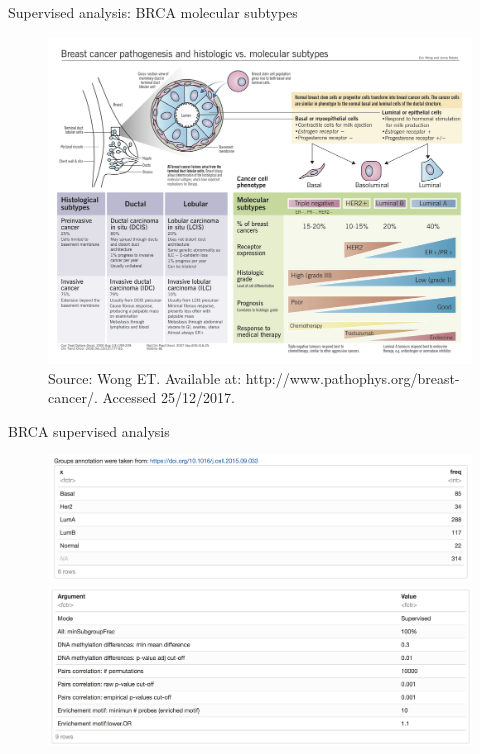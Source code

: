 \documentclass[slidestop,compress,11pt,xcolor=dvipsnames]{beamer}
\begin{document}
\begin{frame}[plain]{Supervised analysis: BRCA molecular subtypes}
\vspace*{-0.45cm}
 \begin{figure}[ht!]
  \centering
  \includegraphics[width=1.0\textwidth]{ELMER/breastcancer-subtypes.png}\tiny{\\Source: Wong ET. Available at: http://www.pathophys.org/breast-cancer/. Accessed 25/12/2017.}
 \end{figure}
\end{frame}

\begin{frame}{BRCA supervised analysis}

 \begin{figure}[ht!]
  \centering
  \includegraphics[width=1.0\textwidth]{ELMER/groups.png}
  \includegraphics[width=1.0\textwidth]{ELMER/arguments.png}
 \end{figure}
\end{frame}
\end{document}
